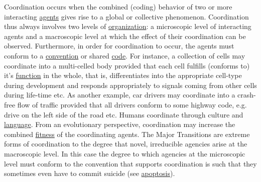 \documentclass[12pt]{article}
\begin{document}
Coordination occurs when the combined (coding) behavior of two or
more interacting \hyperlink{agent}{agents} gives rise to a global or
collective phenomenon. Coordination thus always involves two levels of
\hyperlink{organization}{organization}: a microscopic level of
interacting agents and a macroscopic level at which the effect of
their coordination can be observed. Furthermore, in order for
coordination to occur, the agents must conform to a
\hyperlink{convention}{convention} or shared \hyperlink{code}{code}. For instance, a
collection of cells may coordinate into a multi-celled body provided
that each cell fulfills (conforms to) it's
\hyperlink{function}{function} in the whole, that is, differentiates
into the appropriate cell-type during development and responds
appropriately to signals coming from other cells during life-time
etc. As another example, car drivers may coordinate into a crash-free
flow of traffic provided that all drivers conform to some highway
code, e.g. drive on the left side of the road etc. Humans coordinate
through culture and \hyperlink{language}{language}. From an
evolutionary perspective, coordination may increase the combined
\hyperlink{fitness}{fitness} of the coordinating agents. The Major
Transitions are extreme forms of coordination to the degree that
novel, irreducible agencies arise at the macroscopic level. In this
case the degree to which agencies at the microscopic level must
conform to the convention that supports coordination is such that they
sometimes even have to commit suicide (see \hyperlink{apoptosis}{apoptosis}).

\hypertarget{copying_and_coding}{}
\end{document}
